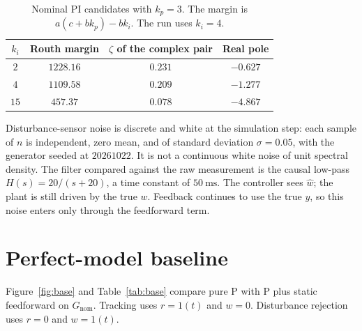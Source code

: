 \documentclass[12pt,a4paper]{article}
\begin{document}
\begin{table}[H]
  \centering
  \caption{Nominal PI candidates with \(k_p=3\). The margin is \(a(c+bk_p)-bk_i\). The run uses \(k_i=4\).}
  \label{tab:ki}
  \begin{tabular}{cccc}
    \toprule
    \(k_i\) & Routh margin & \(\zeta\) of the complex pair & Real pole \\
    \midrule
    \(2\)  & \(1228.16\) & \(0.231\) & \(-0.627\) \\
    \(4\)  & \(1109.58\) & \(0.209\) & \(-1.277\) \\
    \(15\) & \(457.37\)  & \(0.078\) & \(-4.867\) \\
    \bottomrule
  \end{tabular}
\end{table}

Disturbance-sensor noise is discrete and white at the simulation step: each sample of \(n\) is independent, zero mean, and of standard deviation \(\sigma=0.05\), with the generator seeded at \(20261022\).
It is not a continuous white noise of unit spectral density.
The filter compared against the raw measurement is the causal low-pass \(H(s)=20/(s+20)\), a time constant of \(50~\mathrm{ms}\).
The controller sees \(\hat w\); the plant is still driven by the true \(w\). Feedback continues to use the true \(y\), so this noise enters only through the feedforward term.

\section{Perfect-model baseline}

Figure~\ref{fig:base} and Table~\ref{tab:base} compare pure P with P plus static feedforward on \(G_{\mathrm{nom}}\).
Tracking uses \(r=1(t)\) and \(w=0\). Disturbance rejection uses \(r=0\) and \(w=1(t)\).
\end{document}
